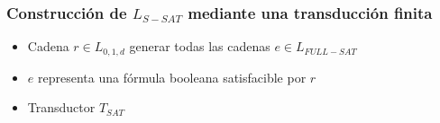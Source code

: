 \documentclass{beamer}
\begin{document}
\begin{frame}
\begin{columns}
\begin{column}{0.6\textwidth}
\begin{figure}[h]
\begin{otherlanguage}{english}
                \end{otherlanguage}
            \end{figure}
        \end{column}
        
    \end{columns}
    
    
\end{frame}

\begin{frame}
    \frametitle{Construcción de $L_{S-SAT}$ mediante una transducción finita}
    
    \begin{itemize}
        \item<1-> Cadena $r\in L_{0,1,d}$ generar todas las cadenas $e\in L_{FULL-SAT}$
        \item<2-> $e$ representa una fórmula booleana satisfacible por $r$
        \item<3-> Transductor $T_{SAT}$
    \end{itemize}
\end{frame}
\end{document}
